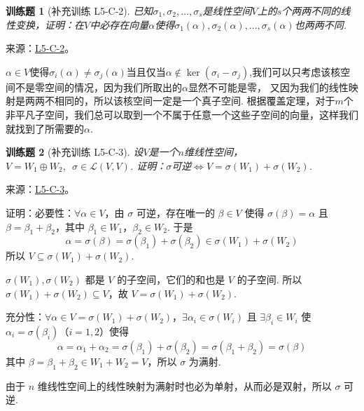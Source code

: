 \documentclass[12pt,fontset=fandol]{ctexart}
\newtheorem{exercise}{训练题}[section]
\begin{document}
\begin{exercise}[补充训练 L5-C-2]\label{prob:L5-C-2}
已知$\sigma_1,\sigma_2,\ldots,\sigma_s$是线性空间$V$上的$s$个两两不同的线性变换，证明：在$V$中必存在向量$\alpha$使得$\sigma_1(\alpha),\sigma_2(\alpha),\ldots,\sigma_s(\alpha)$也两两不同.
\end{exercise}
\noindent 来源：\href{https://github.com/yhwu-is/Linear-Algebra-Left-Undone/blob/new/%E8%AE%B2%E4%B9%89/%E4%B8%93%E9%A2%98/5%20%E7%BA%BF%E6%80%A7%E6%98%A0%E5%B0%84.tex}{L5-C-2}。
\begin{solve}
$\alpha \in V$使得$\sigma_i(\alpha) \neq \sigma_j(\alpha)$当且仅当$\alpha \notin \ker(\sigma_i - \sigma_j)$,我们可以只考虑该核空间不是零空间的情况，因为我们所取出的$\alpha$显然不可能是零，
            又因为我们的线性映射是两两不相同的，所以该核空间一定是一个真子空间. 根据覆盖定理，对于$m$个非平凡子空间，我们总可以取到一个不属于任意一个这些子空间的向量，这样我们就找到了所需要的$\alpha$.
\end{solve}

\begin{exercise}[补充训练 L5-C-3]\label{prob:L5-C-3}
设$V$是一个$n$维线性空间，$V=W_1\oplus W_2,\enspace\sigma\in \mathcal{L}(V,V)$. 证明：$\sigma$可逆$\iff V=\sigma(W_1)+\sigma(W_2)$.
\end{exercise}
\noindent 来源：\href{https://github.com/yhwu-is/Linear-Algebra-Left-Undone/blob/new/%E8%AE%B2%E4%B9%89/%E4%B8%93%E9%A2%98/5%20%E7%BA%BF%E6%80%A7%E6%98%A0%E5%B0%84.tex}{L5-C-3}。
\begin{solve}
证明：必要性：$ \forall \alpha \in V $，由 $ \sigma $ 可逆，存在唯一的 $ \beta \in V $ 使得 $ \sigma(\beta) = \alpha $ 且 $ \beta = \beta_1 + \beta_2 $，其中 $ \beta_1 \in W_1 $，$ \beta_2 \in W_2 $. 于是
          \[ \alpha = \sigma(\beta) = \sigma(\beta_1) + \sigma(\beta_2) \in \sigma(W_1) + \sigma(W_2) \]
          所以 $ V \subseteq \sigma(W_1) + \sigma(W_2) $.

          $ \sigma(W_1), \sigma(W_2) $ 都是 $ V $ 的子空间，它们的和也是 $ V $ 的子空间. 所以 $ \sigma(W_1) + \sigma(W_2) \subseteq V $，故 $ V = \sigma(W_1) + \sigma(W_2) $.

          充分性：$ \forall \alpha \in V = \sigma(W_1) + \sigma(W_2) $，$ \exists \alpha_i \in \sigma(W_i) $ 且 $ \exists \beta_i \in W_i $ 使 $ \alpha_i = \sigma(\beta_i) $（$ i = 1, 2 $）使得
          \[ \alpha = \alpha_1 + \alpha_2 = \sigma(\beta_1) + \sigma(\beta_2) = \sigma(\beta_1 + \beta_2) = \sigma(\beta) \]
          其中 $ \beta = \beta_1 + \beta_2 \in W_1 + W_2 = V $，所以 $ \sigma $ 为满射.

          由于 $ n $ 维线性空间上的线性映射为满射时也必为单射，从而必是双射，所以 $ \sigma $ 可逆.
\end{solve}
\end{document}
